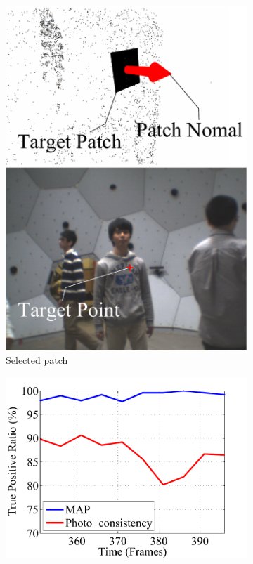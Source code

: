 \begin{figure}[t]
		\begin{subfigure}{0.3\textwidth}
			\includegraphics[width=\textwidth]{figures/GT_input_final}
			\caption{Selected patch}
		\end{subfigure}
	\begin{subfigure}{0.4\textwidth}
		\includegraphics[width=\textwidth]{figures/VisibilityError2}

\end{subfigure}
\end{figure}
